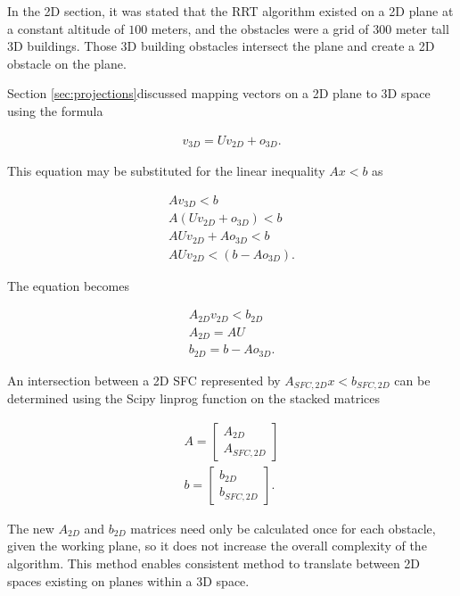In the 2D section, it was stated that the RRT algorithm existed on a 2D plane at a constant altitude of $100$ meters, and the obstacles were a grid of $300$ meter tall 3D buildings. 
Those 3D building obstacles intersect the plane and create a 2D obstacle on the plane. 

Section \ref{sec:projections}discussed mapping vectors on a 2D plane to 3D space using the formula

\begin{align}
    v_{3D} = U v_{2D} + o_{3D}.
\end{align}

This equation may be substituted for the linear inequality $Ax < b$ as

\begin{align}
    A v_{3D} < b\\
    A (U v_{2D} + o_{3D}) < b\\
    A U v_{2D} + A o_{3D} < b\\
    A U v_{2D} < (b - A o_{3D}).
\end{align}

The equation becomes

\begin{align}
    A_{2D} v_{2D} < b_{2D}\\
    A_{2D} = A U\\
    b_{2D} = b - A o_{3D}.
\end{align}

An intersection between a 2D SFC represented by $A_{SFC,2D} x < b_{SFC,2D}$ can be determined using the Scipy linprog function on the stacked matrices

\begin{align}
    A = 
    \begin{bmatrix}
        A_{2D}\\
        A_{SFC,2D}
    \end{bmatrix}\\
    b =
    \begin{bmatrix}
        b_{2D}\\
        b_{SFC,2D}
    \end{bmatrix}.
\end{align}

The new $A_{2D}$ and $b_{2D}$ matrices need only be calculated once for each obstacle, given the working plane, so it does not increase the overall complexity of the algorithm. 
This method enables consistent method to translate between 2D spaces existing on planes within a 3D space.

